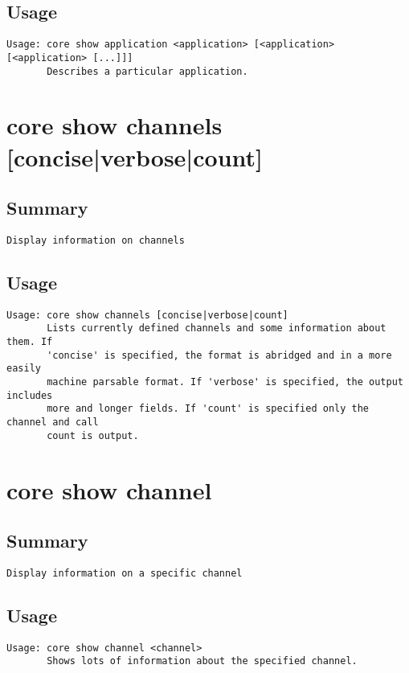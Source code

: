 \subsection{Usage}
\begin{verbatim}
Usage: core show application <application> [<application> [<application> [...]]]
       Describes a particular application.

\end{verbatim}


\section{core show channels [concise|verbose|count]}
\subsection{Summary}
\begin{verbatim}
Display information on channels
\end{verbatim}
\subsection{Usage}
\begin{verbatim}
Usage: core show channels [concise|verbose|count]
       Lists currently defined channels and some information about them. If
       'concise' is specified, the format is abridged and in a more easily
       machine parsable format. If 'verbose' is specified, the output includes
       more and longer fields. If 'count' is specified only the channel and call
       count is output.

\end{verbatim}


\section{core show channel}
\subsection{Summary}
\begin{verbatim}
Display information on a specific channel
\end{verbatim}
\subsection{Usage}
\begin{verbatim}
Usage: core show channel <channel>
       Shows lots of information about the specified channel.

\end{verbatim}


